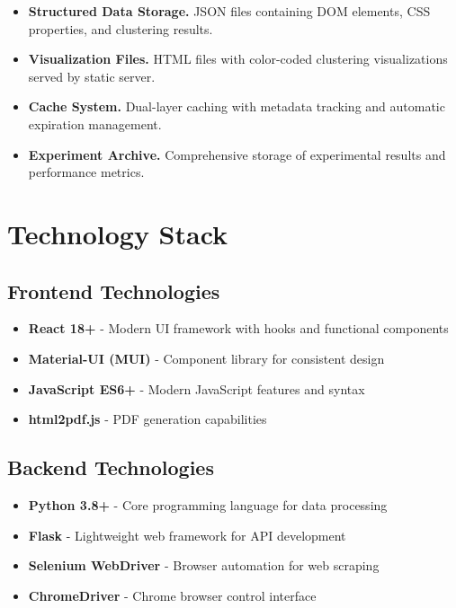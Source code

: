\begin{itemize}
\item \textbf{Structured Data Storage.} JSON files containing DOM elements, CSS properties, and clustering results.
\item \textbf{Visualization Files.} HTML files with color-coded clustering visualizations served by static server.
\item \textbf{Cache System.} Dual-layer caching with metadata tracking and automatic expiration management.
\item \textbf{Experiment Archive.} Comprehensive storage of experimental results and performance metrics.
\end{itemize}

\section{Technology Stack}
\label{sec:technology_stack}

\subsection{Frontend Technologies}

\begin{itemize}
\item \textbf{React 18+} - Modern UI framework with hooks and functional components
\item \textbf{Material-UI (MUI)} - Component library for consistent design
\item \textbf{JavaScript ES6+} - Modern JavaScript features and syntax
\item \textbf{html2pdf.js} - PDF generation capabilities
\end{itemize}

\subsection{Backend Technologies}

\begin{itemize}
\item \textbf{Python 3.8+} - Core programming language for data processing
\item \textbf{Flask} - Lightweight web framework for API development
\item \textbf{Selenium WebDriver} - Browser automation for web scraping
\item \textbf{ChromeDriver} - Chrome browser control interface
\end{itemize}

